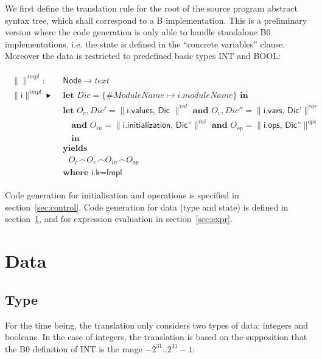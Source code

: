 \documentclass{article}
\newcommand{\trad}[2]{\ensuremath{\lVert \textsf{#1} \rVert^{\textit{#2}}}}
\DeclareMathOperator{\conc}{\smallfrown}
\DeclareMathOperator{\isdef}{\blacktriangleright}
\begin{document}
We first define the translation rule for the root of the source
program abstract syntax tree, which shall correspond to a B
implementation. This is a preliminary version where the code
generation is only able to handle standalone B0 implementations, i.e.
the state is defined in the ``concrete variables'' clause. Moreover
the data is restricted to predefined basic types \textsf{INT} and
\textsf{BOOL}:
\begin{framed}
\begin{align}
\begin{split}
  \trad{}{impl} : & \textsf{ Node} \rightarrow text \\
  \trad{i}{impl} \isdef & \textbf{ let } Dic = \{ \#ModuleName \mapsto  i.moduleName\} \textbf{ in}\\
  & \textbf{ let } O_{c}, Dic'  = \trad{i.values, Dic }{val} \textbf{ and } O_v, Dic'' = \trad{i.vars, Dic'}{var} \\
  & \quad \textbf{ and } O_{in} = \trad{i.initialization, Dic''}{ini} \textbf{ and } O_{op} = \trad{i.ops, Dic''}{ops} \\
  & \quad \textbf{ in} \\
  & \textbf{ yields } \\
  & \quad O_{c} \conc O_{v} \conc O_{in} \conc O_{op}    \\
  & \textbf{ where } \textsf{i.k} = \textsf{Impl} 
\end{split}
\end{align}
\end{framed}



Code generation for initialisation and operations is specified in
section~\ref{sec:control}. Code generation for data (type and
state) is defined in section~\ref{sec:data}, and for expression
evaluation in section~\ref{sec:expr}. 

\section{Data}
\label{sec:data}

\subsection{Type}
\label{sec:type}
For the time being, the translation only considers two types of
data: integers and booleans. In the case of integers, the translation
is based on the supposition that the B0 definition of \textsf{INT}
is the range $-2^{31}.. 2^{31}-1$:
\end{document}
